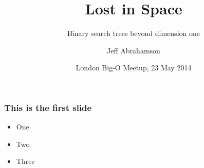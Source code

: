 \documentclass{beamer}
\title[Lost!] %
{Lost in Space}
\subtitle{Binary search trees beyond dimension one}
\author[Abrahamson]
{Jeff Abrahamson}
\institute[Google]{Google, Inc.}
\date[Big-O Meetup]
{London Big-O Meetup, 23 May 2014}
\begin{document}

\begin{frame}
  \titlepage
\end{frame}

\begin{frame}
  \frametitle{This is the first slide}
  \begin{itemize}
  \item One
  \item Two
  \item Three
  \end{itemize}
\end{frame}
\end{document}
